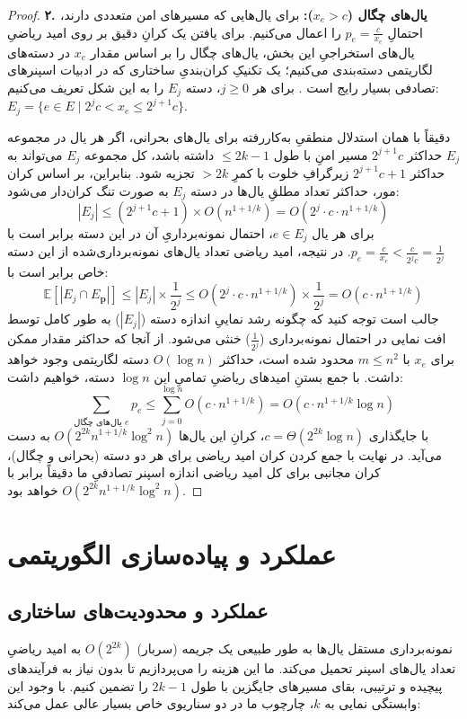 \documentclass[11pt,a4paper]{report}
\theoremstyle{plain}
\theoremstyle{definition}
\theoremstyle{remark}
\begin{document}
\begin{proof}
\textbf{۲. یال‌های چگال ($x_e > c$):}
برای یال‌هایی که مسیرهای امن متعددی دارند، احتمالِ $p_e = \frac{c}{x_e}$ را اعمال می‌کنیم. برای یافتن یک کرانِ دقیق بر روی امید ریاضیِ یال‌های استخراجیِ این بخش، یال‌های چگال را بر اساس مقدار $x_e$ در دسته‌های لگاریتمی دسته‌بندی می‌کنیم؛ یک تکنیکِ کران‌بندیِ ساختاری که در ادبیات اسپنرهای تصادفی بسیار رایج است \cite{baswana2007simple, elkin2019efficient}. 
برای هر $j \ge 0$، دسته $E_j$ را به این شکل تعریف می‌کنیم: $E_j = \{ e \in E \mid 2^j c < x_e \le 2^{j+1} c \}$.

دقیقاً با همان استدلال منطقیِ به‌کاررفته برای یال‌های بحرانی، اگر هر یال در مجموعه $E_j$ حداکثر $2^{j+1} c$ مسیر امنِ با طول $\le 2k-1$ داشته باشد، کل مجموعه $E_j$ می‌تواند به حداکثر $2^{j+1} c + 1$ زیرگرافِ خلوت با کمرِ $>2k$ تجزیه شود. بنابراین، بر اساس کران مور، حداکثر تعداد مطلقِ یال‌ها در دسته $E_j$ به صورت تنگ کران‌دار می‌شود:
\[
|E_j| \le (2^{j+1} c + 1) \times O(n^{1+1/k}) = O(2^j \cdot c \cdot n^{1+1/k})
\]
برای هر یال $e \in E_j$، احتمال نمونه‌برداریِ آن در این دسته برابر است با $p_e = \frac{c}{x_e} < \frac{c}{2^j c} = \frac{1}{2^j}$.
در نتیجه، امید ریاضی تعداد یال‌های نمونه‌برداری‌شده از این دسته خاص برابر است با:
\[
\mathbb{E}[|E_j \cap E_{\mathbf{p}}|] \le |E_j| \times \frac{1}{2^j} \le O(2^j \cdot c \cdot n^{1+1/k}) \times \frac{1}{2^j} = O(c \cdot n^{1+1/k})
\]
جالب است توجه کنید که چگونه رشد نماییِ اندازه دسته ($|E_j|$) به طور کامل توسط افت نمایی در احتمال نمونه‌برداری ($\frac{1}{2^j}$) خنثی می‌شود. از آنجا که حداکثر مقدار ممکن برای $x_e$ با $m \le n^2$ محدود شده است، حداکثر $O(\log n)$ دسته لگاریتمی وجود خواهد داشت. با جمع بستنِ امیدهای ریاضیِ تمامیِ این $\log n$ دسته، خواهیم داشت:
\[
\sum_{\text{یال‌های چگال } e} p_e \le \sum_{j=0}^{\log n} O(c \cdot n^{1+1/k}) = O(c \cdot n^{1+1/k} \log n)
\]
با جایگذاری $c = \Theta(2^{2k} \log n)$، کرانِ این یال‌ها $O(2^{2k} n^{1+1/k} \log^2 n)$ به دست می‌آید. در نهایت با جمع کردن کران امید ریاضی برای هر دو دسته (بحرانی و چگال)، کران مجانبی برای کل امید ریاضی اندازه اسپنر تصادفیِ ما دقیقاً برابر با $O(2^{2k} n^{1+1/k} \log^2 n)$ خواهد بود.
\end{proof}

\chapter{عملکرد و پیاده‌سازی الگوریتمی}

\section{عملکرد و محدودیت‌های ساختاری}
نمونه‌برداری مستقل یال‌ها به طور طبیعی یک جریمه (سربار) $O(2^{2k})$ به امید ریاضیِ تعداد یال‌های اسپنر تحمیل می‌کند. ما این هزینه را می‌پردازیم تا بدون نیاز به فرآیندهای پیچیده و ترتیبی، بقای مسیرهای جایگزین با طول $2k-1$ را تضمین کنیم. با وجود این وابستگی نمایی به $k$، چارچوب ما در دو سناریوی خاص بسیار عالی عمل می‌کند:
\end{document}
